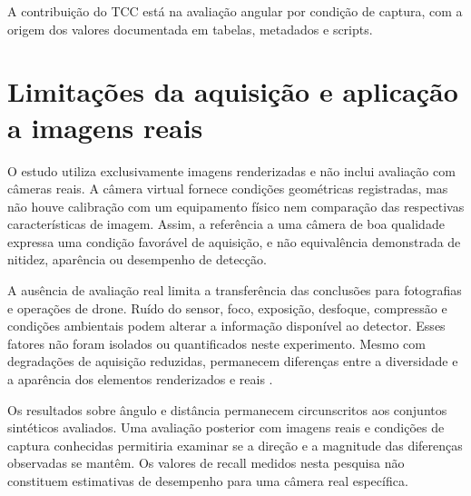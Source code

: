 A contribuição do TCC está na avaliação angular por condição de captura, com a origem dos valores documentada em tabelas, metadados e scripts.


\section{Limitações da aquisição e aplicação a imagens reais}
O estudo utiliza exclusivamente imagens renderizadas e não inclui avaliação com câmeras reais. A câmera virtual fornece condições geométricas registradas, mas não houve calibração com um equipamento físico nem comparação das respectivas características de imagem. Assim, a referência a uma câmera de boa qualidade expressa uma condição favorável de aquisição, e não equivalência demonstrada de nitidez, aparência ou desempenho de detecção.

A ausência de avaliação real limita a transferência das conclusões para fotografias e operações de drone. Ruído do sensor, foco, exposição, desfoque, compressão e condições ambientais podem alterar a informação disponível ao detector. Esses fatores não foram isolados ou quantificados neste experimento. Mesmo com degradações de aquisição reduzidas, permanecem diferenças entre a diversidade e a aparência dos elementos renderizados e reais \cite{tobin2017domain,tremblay2018synthetic}.

Os resultados sobre ângulo e distância permanecem circunscritos aos conjuntos sintéticos avaliados. Uma avaliação posterior com imagens reais e condições de captura conhecidas permitiria examinar se a direção e a magnitude das diferenças observadas se mantêm. Os valores de recall medidos nesta pesquisa não constituem estimativas de desempenho para uma câmera real específica.
